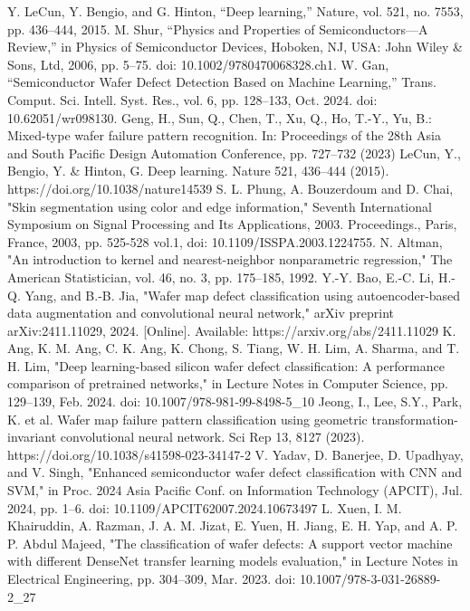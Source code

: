 \documentclass[conference]{IEEEtran}
\begin{document}
\begin{thebibliography}{00}
 Y. LeCun, Y. Bengio, and G. Hinton, “Deep learning,” Nature, vol. 521, no. 7553, pp. 436–444, 2015.
 M. Shur, “Physics and Properties of Semiconductors—A Review,” in Physics of Semiconductor Devices, Hoboken, NJ, USA: John Wiley \& Sons, Ltd, 2006, pp. 5–75. doi: 10.1002/9780470068328.ch1.
 W. Gan, “Semiconductor Wafer Defect Detection Based on Machine Learning,” Trans. Comput. Sci. Intell. Syst. Res., vol. 6, pp. 128–133, Oct. 2024. doi: 10.62051/wr098130.
 Geng, H., Sun, Q., Chen, T., Xu, Q., Ho, T.-Y., Yu, B.: Mixed-type wafer failure pattern recognition. In: Proceedings of the 28th Asia and South Pacific Design Automation Conference, pp. 727–732 (2023)
 LeCun, Y., Bengio, Y. \& Hinton, G. Deep learning. Nature 521, 436–444 (2015). https://doi.org/10.1038/nature14539
 S. L. Phung, A. Bouzerdoum and D. Chai, "Skin segmentation using color and edge information," Seventh International Symposium on Signal Processing and Its Applications, 2003. Proceedings., Paris, France, 2003, pp. 525-528 vol.1, doi: 10.1109/ISSPA.2003.1224755.
 N. Altman, "An introduction to kernel and nearest-neighbor nonparametric regression," The American Statistician, vol. 46, no. 3, pp. 175–185, 1992.
 Y.-Y. Bao, E.-C. Li, H.-Q. Yang, and B.-B. Jia, "Wafer map defect classification using autoencoder-based data augmentation and convolutional neural network," arXiv preprint arXiv:2411.11029, 2024. [Online]. Available: https://arxiv.org/abs/2411.11029
 K. Ang, K. M. Ang, C. K. Ang, K. Chong, S. Tiang, W. H. Lim, A. Sharma, and T. H. Lim, "Deep learning-based silicon wafer defect classification: A performance comparison of pretrained networks," in Lecture Notes in Computer Science, pp. 129–139, Feb. 2024. doi: 10.1007/978-981-99-8498-5\_10
 Jeong, I., Lee, S.Y., Park, K. et al. Wafer map failure pattern classification using geometric transformation-invariant convolutional neural network. Sci Rep 13, 8127 (2023). https://doi.org/10.1038/s41598-023-34147-2
 V. Yadav, D. Banerjee, D. Upadhyay, and V. Singh, "Enhanced semiconductor wafer defect classification with CNN and SVM," in Proc. 2024 Asia Pacific Conf. on Information Technology (APCIT), Jul. 2024, pp. 1–6. doi: 10.1109/APCIT62007.2024.10673497
 L. Xuen, I. M. Khairuddin, A. Razman, J. A. M. Jizat, E. Yuen, H. Jiang, E. H. Yap, and A. P. P. Abdul Majeed, "The classification of wafer defects: A support vector machine with different DenseNet transfer learning models evaluation," in Lecture Notes in Electrical Engineering, pp. 304–309, Mar. 2023. doi: 10.1007/978-3-031-26889-2\_27

\end{thebibliography}
\end{document}
